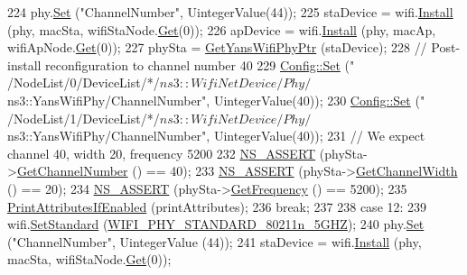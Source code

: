 \begin{DoxyCode}
224       phy.\hyperlink{classns3_1_1WifiPhyHelper_a2527d6d7b29f717fd7436166c5f05f1a}{Set} (\textcolor{stringliteral}{"ChannelNumber"}, UintegerValue(44));
225       staDevice = wifi.\hyperlink{classns3_1_1WifiHelper_a451b3d33fa1497c22f06c5451f57a127}{Install} (phy, macSta, wifiStaNode.\hyperlink{classns3_1_1NodeContainer_a9ed96e2ecc22e0f5a3d4842eb9bf90bf}{Get}(0));
226       apDevice = wifi.\hyperlink{classns3_1_1WifiHelper_a451b3d33fa1497c22f06c5451f57a127}{Install} (phy, macAp, wifiApNode.\hyperlink{classns3_1_1NodeContainer_a9ed96e2ecc22e0f5a3d4842eb9bf90bf}{Get}(0));
227       phySta = \hyperlink{wifi-phy-configuration_8cc_a50ec12cbf31121934173cb4a44215e73}{GetYansWifiPhyPtr} (staDevice);
228       \textcolor{comment}{// Post-install reconfiguration to channel number 40}
229       \hyperlink{group__config_gadce03667ec621d64ce4aace85d9bcfd0}{Config::Set} (\textcolor{stringliteral}{"
      /NodeList/0/DeviceList/*/$ns3::WifiNetDevice/Phy/$ns3::YansWifiPhy/ChannelNumber"}, UintegerValue(40));
230       \hyperlink{group__config_gadce03667ec621d64ce4aace85d9bcfd0}{Config::Set} (\textcolor{stringliteral}{"
      /NodeList/1/DeviceList/*/$ns3::WifiNetDevice/Phy/$ns3::YansWifiPhy/ChannelNumber"}, UintegerValue(40));
231       \textcolor{comment}{// We expect channel 40, width 20, frequency 5200}
232       \hyperlink{assert_8h_a6dccdb0de9b252f60088ce281c49d052}{NS\_ASSERT} (phySta->\hyperlink{classns3_1_1WifiPhy_a5cf0ccf06109ace61db51c83e91b7e8d}{GetChannelNumber} () == 40);
233       \hyperlink{assert_8h_a6dccdb0de9b252f60088ce281c49d052}{NS\_ASSERT} (phySta->\hyperlink{classns3_1_1WifiPhy_a4a5d5009b3b3308f2baeed42a2007189}{GetChannelWidth} () == 20);
234       \hyperlink{assert_8h_a6dccdb0de9b252f60088ce281c49d052}{NS\_ASSERT} (phySta->\hyperlink{classns3_1_1WifiPhy_ad2508d94faf22d690d6b8b4367934fd1}{GetFrequency} () == 5200);
235       \hyperlink{wifi-phy-configuration_8cc_a73f0822e1f64b23097cbff2fc565842f}{PrintAttributesIfEnabled} (printAttributes);
236       \textcolor{keywordflow}{break};
237 
238     \textcolor{keywordflow}{case} 12:
239       wifi.\hyperlink{classns3_1_1WifiHelper_aa54f3e61527ef8de318d310045bc5dfd}{SetStandard} (\hyperlink{group__wifi_gga1299834f4e1c615af3ca738033b76a49aaabe94a0be4668583c42595437b4a6c0}{WIFI\_PHY\_STANDARD\_80211n\_5GHZ});
240       phy.\hyperlink{classns3_1_1WifiPhyHelper_a2527d6d7b29f717fd7436166c5f05f1a}{Set} (\textcolor{stringliteral}{"ChannelNumber"}, UintegerValue (44));
241       staDevice = wifi.\hyperlink{classns3_1_1WifiHelper_a451b3d33fa1497c22f06c5451f57a127}{Install} (phy, macSta, wifiStaNode.\hyperlink{classns3_1_1NodeContainer_a9ed96e2ecc22e0f5a3d4842eb9bf90bf}{Get}(0));

\end{DoxyCode}
